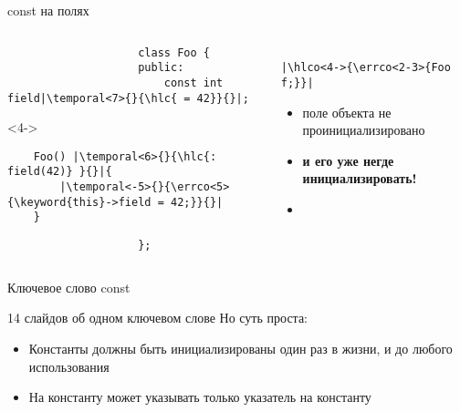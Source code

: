 \documentclass[aspectratio=169,14pt]{beamer}
\begin{document}
    \begin{frame}[fragile]{const на полях}
        \begin{columns}[T]
            \begin{column}{0.5\textwidth}
                \begin{verbatim}
                    class Foo {
                    public:
                        const int field|\temporal<7>{}{\hlc{ = 42}}{}|;
                \end{verbatim}
                \begin{onlyenv}<4->
                    \begin{verbatim}
    Foo() |\temporal<6>{}{\hlc{: field(42)} }{}|{
        |\temporal<-5>{}{\errco<5>{\keyword{this}->field = 42;}}{}|
    }
                    \end{verbatim}
                \end{onlyenv}
                \begin{verbatim}
                    };
                \end{verbatim}
            \end{column}
            \begin{column}{0.5\textwidth}
                \begin{verbatim}
                    |\hlco<4->{\errco<2-3>{Foo f;}}|
                \end{verbatim}
                \footnotesize
                \begin{itemize}
                    \item<2-5> поле  объекта  не проинициализировано
                    \item<3-5> \textbf{и его уже негде инициализировать!}
                    \item<6-> 
                \end{itemize}
            \end{column}
        \end{columns}
    \end{frame}

    \begin{frame}{Ключевое слово const}
        \begin{block}{14 слайдов об одном ключевом слове}
            Но суть проста:
            \begin{itemize}
                \item Константы должны быть инициализированы один раз в жизни, и до любого использования
                \item На константу может указывать только указатель на константу
            \end{itemize}
        \end{block}
    \end{frame}
\end{document}
